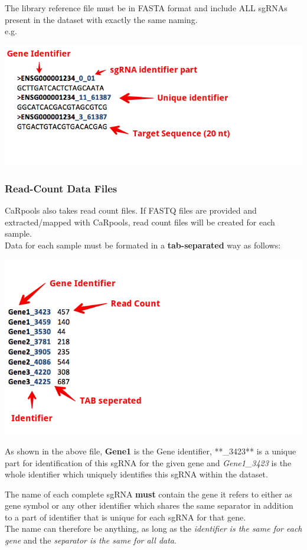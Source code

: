 \documentclass[]{article}
\begin{document}
The library reference file must be in FASTA format and include ALL
sgRNAs present in the dataset with exactly the same naming.\\
e.g.

\includegraphics{./pictures/library-fasta.png}

\subsubsection{Read-Count Data Files}\label{read-count-data-files}

CaRpools also takes read count files. If FASTQ files are provided and
extracted/mapped with CaRpools, read count files will be created for
each sample.\\
Data for each sample must be formated in a \textbf{tab-separated} way as
follows:

\includegraphics{./pictures/readcount.png}

As shown in the above file, \textbf{Gene1} is the Gene identifier,
**\_3423** is a unique part for identification of this sgRNA for the
given gene and \emph{Gene1\_3423} is the whole identifier which uniquely
identifies this sgRNA within the dataset.

The name of each complete sgRNA \textbf{must} contain the gene it refers
to either as gene symbol or any other identifier which shares the same
separator in addition to a part of identifier that is unique for each
sgRNA for that gene.\\
The name can therefore be anything, as long as the \emph{identifier is
the same for each gene} and the \emph{separator is the same for all
data}.
\end{document}
